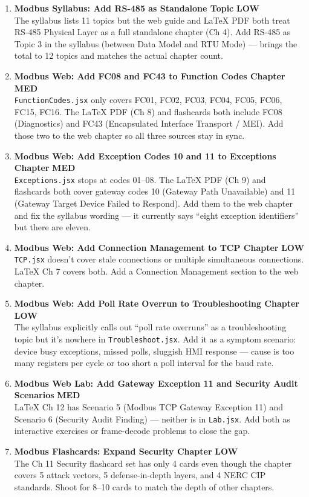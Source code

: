 \documentclass[10pt]{article}
\newcommand{\med}{\textcolor{samber}{\small\bfseries MED}}
\newcommand{\low}{\textcolor{sgreen}{\small\bfseries LOW}}
\begin{document}
\begin{enumerate}[resume]\small
  \item \textbf{Modbus Syllabus: Add RS-485 as Standalone Topic} \hfill \low \\
    The syllabus lists 11 topics but the web guide and LaTeX PDF both treat RS-485 Physical Layer as a full standalone chapter (Ch 4). Add RS-485 as Topic 3 in the syllabus (between Data Model and RTU Mode) — brings the total to 12 topics and matches the actual chapter count.

  \item \textbf{Modbus Web: Add FC08 and FC43 to Function Codes Chapter} \hfill \med \\
    \texttt{FunctionCodes.jsx} only covers FC01, FC02, FC03, FC04, FC05, FC06, FC15, FC16. The LaTeX PDF (Ch 8) and flashcards both include FC08 (Diagnostics) and FC43 (Encapsulated Interface Transport / MEI). Add those two to the web chapter so all three sources stay in sync.

  \item \textbf{Modbus Web: Add Exception Codes 10 and 11 to Exceptions Chapter} \hfill \med \\
    \texttt{Exceptions.jsx} stops at codes 01--08. The LaTeX PDF (Ch 9) and flashcards both cover gateway codes 10 (Gateway Path Unavailable) and 11 (Gateway Target Device Failed to Respond). Add them to the web chapter and fix the syllabus wording — it currently says ``eight exception identifiers'' but there are eleven.

  \item \textbf{Modbus Web: Add Connection Management to TCP Chapter} \hfill \low \\
    \texttt{TCP.jsx} doesn't cover stale connections or multiple simultaneous connections. LaTeX Ch 7 covers both. Add a Connection Management section to the web chapter.

  \item \textbf{Modbus Web: Add Poll Rate Overrun to Troubleshooting Chapter} \hfill \low \\
    The syllabus explicitly calls out ``poll rate overruns'' as a troubleshooting topic but it's nowhere in \texttt{Troubleshoot.jsx}. Add it as a symptom scenario: device busy exceptions, missed polls, sluggish HMI response — cause is too many registers per cycle or too short a poll interval for the baud rate.

  \item \textbf{Modbus Web Lab: Add Gateway Exception 11 and Security Audit Scenarios} \hfill \med \\
    LaTeX Ch 12 has Scenario 5 (Modbus TCP Gateway Exception 11) and Scenario 6 (Security Audit Finding) — neither is in \texttt{Lab.jsx}. Add both as interactive exercises or frame-decode problems to close the gap.

  \item \textbf{Modbus Flashcards: Expand Security Chapter} \hfill \low \\
    The Ch 11 Security flashcard set has only 4 cards even though the chapter covers 5 attack vectors, 5 defense-in-depth layers, and 4 NERC CIP standards. Shoot for 8--10 cards to match the depth of other chapters.
\end{enumerate}
\end{document}
